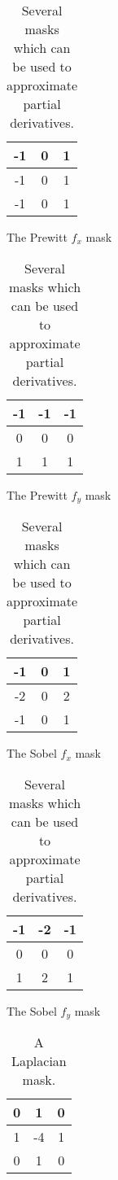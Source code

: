 \documentclass[headings=optiontoheadandtoc,listof=totoc,parskip=full]{scrartcl}
\begin{document}
\begin{table}[H]
	\centering
	\begin{subtable}{.23\textwidth}
		\centering
		\begin{tabular}{|c|c|c|}
			\hline
			-1 & 0 & 1 \\\hline
	        -1 & 0 & 1 \\\hline
	        -1 & 0 & 1 \\\hline
		\end{tabular}
		\caption{The Prewitt $f_x$ mask}
		\label{tab:prewitt-x}
	\end{subtable}
	\hfill
	\begin{subtable}{.23\textwidth}
		\centering
		\begin{tabular}{|c|c|c|}
			\hline
			-1 & -1 & -1 \\\hline
	         0 &  0 &  0 \\\hline
	         1 &  1 &  1 \\\hline
		\end{tabular}
		\caption{The Prewitt $f_y$ mask}
		\label{tab:prewitt-y}
	\end{subtable}
	\hfill
	\begin{subtable}{.23\textwidth}
		\centering
		\begin{tabular}{|c|c|c|}
			\hline
			-1 & 0 & 1 \\\hline
	        -2 & 0 & 2 \\\hline
	        -1 & 0 & 1 \\\hline
		\end{tabular}
		\caption{The Sobel $f_x$ mask}
		\label{tab:sobel-x}
	\end{subtable}
	\hfill
	\begin{subtable}{.23\textwidth}
		\centering
		\begin{tabular}{|c|c|c|}
			\hline
			-1 & -2 & -1 \\\hline
	         0 &  0 &  0 \\\hline
	         1 &  2 &  1 \\\hline
		\end{tabular}
		\caption{The Sobel $f_y$ mask}
		\label{tab:sobel-y}
	\end{subtable}
	
	\caption{Several masks which can be used to approximate partial derivatives.}
	\label{tab:diff-masks}
\end{table}

\begin{table}[H]
	\centering
	\begin{tabular}{|c|c|c|}
		\hline
		0 &  1 & 0 \\\hline
		1 & -4 & 1 \\\hline
		0 &  1 & 0 \\\hline
	\end{tabular}
	\caption{A Laplacian mask.}
	\label{tab:laplacian-mask}
\end{table}
\end{document}
